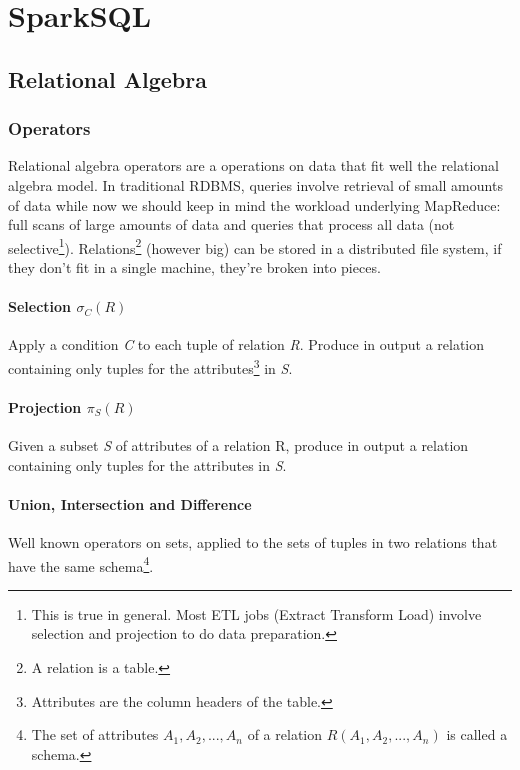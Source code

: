 \chapter{SparkSQL}

\section{Relational Algebra}	
	\subsection{Operators}
		\par
		Relational algebra operators are a operations on data that fit well the relational algebra model.
		\newline
		In traditional RDBMS, queries involve retrieval of small amounts of data while now we should keep in mind the workload underlying MapReduce: full scans of large amounts of data and queries that process all data (not selective\footnote{This is true in general. Most ETL jobs (Extract Transform Load) involve selection and projection to do data preparation.}).
		\newline
		Relations\footnote{A relation is a table.} (however big) can be stored in a distributed file system, if they don't fit in a single machine, they're broken into pieces.
		\subsubsection{Selection $\sigma_C(R)$}
			\par
			Apply a condition \textit{C} to each tuple of relation \textit{R}.
			\newline
			Produce in output a relation containing only tuples for the attributes\footnote{Attributes are the column headers of the table.} in \textit{S}.
		\subsubsection{Projection $\pi_S(R)$}
			\par
			Given a subset \textit{S} of attributes of a relation R, produce in output a relation containing only tuples for the attributes in \textit{S}.
		\subsubsection{Union, Intersection and Difference}
			\par
			Well known operators on sets, applied to the sets of tuples in two relations that have the same schema\footnote{The set of attributes $A_1, A_2, ..., A_n$ of a relation $R(A_1, A_2, ..., A_n)$ is called a schema.}.

